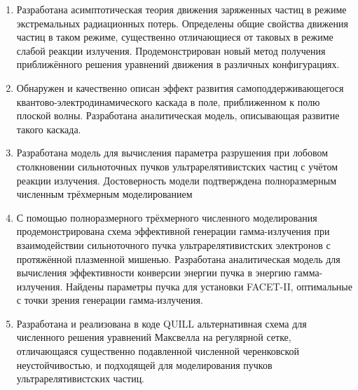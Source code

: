 \vspace{0.25cm}
{\novelty}
\begin{enumerate}[beginpenalty=10000] %
  \item Разработана асимптотическая теория движения заряженных частиц в режиме экстремальных радиационных потерь. Определены общие свойства движения частиц в таком режиме, существенно отличающиеся от таковых в режиме слабой реакции излучения. Продемонстрирован новый метод получения приближённого решения уравнений движения в различных конфигурациях.
  \item Обнаружен и качественно описан эффект развития самоподдерживающегося квантово-электродинамического каскада в поле, приближенном к полю плоской волны. Разработана аналитическая модель, описывающая развитие такого каскада.
  \item Разработана модель для вычисления параметра разрушения при лобовом столкновении сильноточных пучков ультрарелятивистских частиц с учётом реакции излучения. Достоверность модели подтверждена полноразмерным численным трёхмерным моделированием
  \item С помощью полноразмерного трёхмерного численного моделирования продемонстрирована схема эффективной генерации гамма-излучения при взаимодействии сильноточного пучка ультрарелятивистских электронов с протяжённой плазменной мишенью. Разработана аналитическая модель для вычисления эффективности конверсии энергии пучка в энергию гамма-излучения. Найдены параметры пучка для установки FACET-II, оптимальные с точки зрения генерации гамма-излучения.
  \item Разработана и реализована в коде QUILL альтернативная схема для численного решения уравнений Максвелла на регулярной сетке, отличающаяся существенно подавленной численной черенковской неустойчивостью, и подходящей для моделирования пучков ультрарелятивистских частиц.
\end{enumerate}


